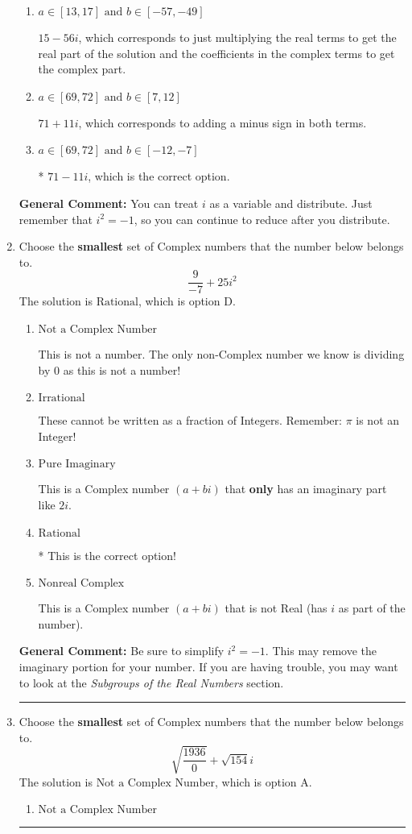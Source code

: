 \documentclass{extbook}[14pt]
\newcommand{\litem}[1]{\item #1

\rule{\textwidth}{0.4pt}}
\begin{document}
\begin{enumerate}
{\begin{enumerate}[label=\Alph*.]
 $-41 + 59 i$, which corresponds to adding a minus sign in the second term.
\item \( a \in [13, 17] \text{ and } b \in [-57, -49] \)

 $15 - 56 i$, which corresponds to just multiplying the real terms to get the real part of the solution and the coefficients in the complex terms to get the complex part.
\item \( a \in [69, 72] \text{ and } b \in [7, 12] \)

 $71 + 11 i$, which corresponds to adding a minus sign in both terms.
\item \( a \in [69, 72] \text{ and } b \in [-12, -7] \)

* $71 - 11 i$, which is the correct option.
\end{enumerate}

\textbf{General Comment:} You can treat $i$ as a variable and distribute. Just remember that $i^2=-1$, so you can continue to reduce after you distribute.
}
\litem{
Choose the \textbf{smallest} set of Complex numbers that the number below belongs to.
\[ \frac{9}{-7}+25i^2 \]The solution is \( \text{Rational} \), which is option D.\begin{enumerate}[label=\Alph*.]
\item \( \text{Not a Complex Number} \)

This is not a number. The only non-Complex number we know is dividing by 0 as this is not a number!
\item \( \text{Irrational} \)

These cannot be written as a fraction of Integers. Remember: $\pi$ is not an Integer!
\item \( \text{Pure Imaginary} \)

This is a Complex number $(a+bi)$ that \textbf{only} has an imaginary part like $2i$.
\item \( \text{Rational} \)

* This is the correct option!
\item \( \text{Nonreal Complex} \)

This is a Complex number $(a+bi)$ that is not Real (has $i$ as part of the number).
\end{enumerate}

\textbf{General Comment:} Be sure to simplify $i^2 = -1$. This may remove the imaginary portion for your number. If you are having trouble, you may want to look at the \textit{Subgroups of the Real Numbers} section.
}
\litem{
Choose the \textbf{smallest} set of Complex numbers that the number below belongs to.
\[ \sqrt{\frac{1936}{0}}+\sqrt{154} i \]The solution is \( \text{Not a Complex Number} \), which is option A.\begin{enumerate}[label=\Alph*.]
\item \( \text{Not a Complex Number} \)


\end{enumerate}}
\end{enumerate}
\end{document}
